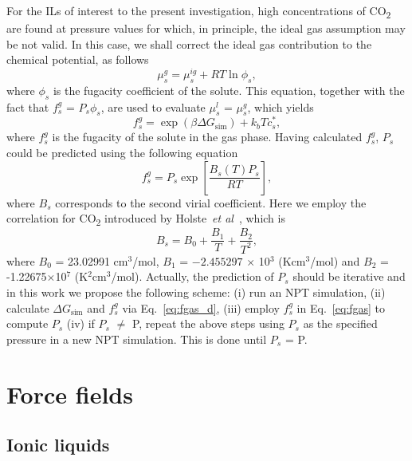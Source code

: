 \documentclass[3p,twocolumn]{elsarticle}
\begin{document}
For the ILs of interest to the present investigation, high concentrations of CO\textsubscript{2} are found at pressure values for which, in principle, the ideal gas assumption may be not valid. In this case, we shall correct the ideal gas contribution to the chemical potential, as follows
\begin{equation}
\label{eq:mu_gas_real}
\mu^{g}_s = \mu^{ig}_s + RT \ln \phi_s,
\end{equation}
where $\phi_s$ is the fugacity coefficient of the solute. This equation, together with the fact that $f^{g}_s$ = $P_s \phi_s$, are used to evaluate $\mu^{l}_s$ = $\mu^{g}_s$, which yields
\begin{equation}
\label{eq:fgas_d}
f^{g}_s = \exp  \left( \beta \Delta G_{\text{sim}} \right) +  k_b T c_s^{\ast}, 
\end{equation}
where $f^{g}_s$ is the fugacity of the solute in the gas phase. Having calculated $f^{g}_s$, $P_s$ could be predicted using the following equation
\begin{equation}
\label{eq:fgas}
f^{g}_s = P_s \exp\left[ \frac{B_s(T) P_s}{R T} \right],
\end{equation}
where $B_s$ corresponds to the second virial coefficient. Here we employ the correlation for CO\textsubscript{2} introduced by Holste~\textit{et al}~\cite{Holste_1987}, which is
\begin{equation}
B_s = B_0 + \frac{B_1}{T} + \frac{B_2}{T^2},
\end{equation}
where $B_0$ = 23.02991 cm$^3$/mol, $B_1$ = $-2.455297$ $\times$ 10$^3$ (Kcm$^3$/mol) and $B_2$ = -1.22675$\times$10$^7$ (K$^2$cm$^3$/mol). Actually, the prediction of $P_s$ should be iterative and in this work we propose the following scheme: (i) run an NPT simulation, (ii) calculate $\Delta G_{\text{sim}}$ and $f^{g}_s$ via Eq.~\ref{eq:fgas_d}, (iii) employ $f^{g}_s$ in Eq.~\ref{eq:fgas} to compute $P_s$ (iv) if $P_s$ $\neq$ P, repeat the above steps using $P_s$ as the specified pressure in a new NPT simulation. This is done until $P_s$ = P.

\section{Force fields}
\label{sec:force_field}
\subsection{Ionic liquids}
\label{sec:force_field_il}
\end{document}
